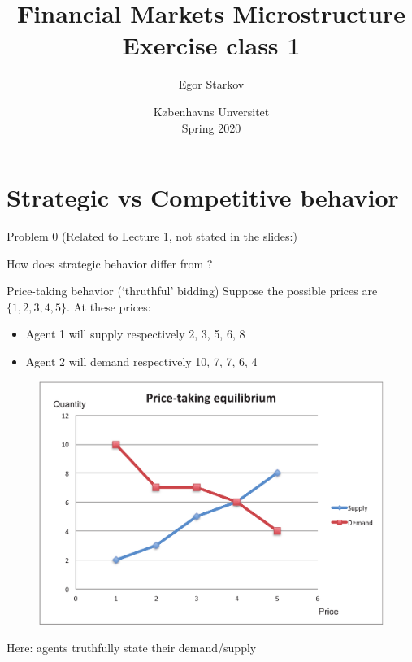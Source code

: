 \documentclass[english,10pt]{beamer}
\title{Financial Markets Microstructure \\ Exercise class 1}
\author{Egor Starkov}
\date{K{\o}benhavns Unversitet \\
	Spring 2020}
\theoremstyle{definition}
\begin{document}
\frame[plain]{\titlepage}
\addtocounter{framenumber}{-1}



\section{Strategic vs Competitive behavior}

\begin{frame}{Problem 0}
	(Related to Lecture 1, not stated in the slides:)
	
	How does \alert{strategic} behavior differ from ?
\end{frame}


\begin{frame}{Price-taking behavior (`thruthful' bidding)}
	Suppose the possible prices are $\{1,2,3,4,5\}$. At these prices:
	\begin{itemize}
		\item Agent 1 will supply respectively 2, 3, 5, 6, 8
		\item Agent 2 will demand respectively 10, 7, 7, 6, 4
	\end{itemize}
	\begin{figure}
		\includegraphics[width=.4\paperwidth]{pics/Image_PriceTaking2}
	\end{figure}
	Here: agents truthfully state their demand/supply
\end{frame}
\end{document}
